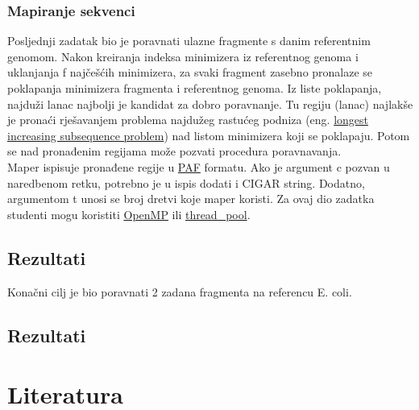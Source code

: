 \documentclass[times, 12pt, utf8]{article}
\begin{document}
        \subsubsection{Mapiranje sekvenci}
        Posljednji zadatak bio je poravnati ulazne fragmente s danim referentnim genomom.
        Nakon kreiranja indeksa minimizera iz referentnog genoma i uklanjanja f najčešćih minimizera, za svaki fragment zasebno pronalaze se poklapanja minimizera fragmenta i referentnog genoma. Iz liste poklapanja, najduži lanac najbolji je kandidat za dobro poravnanje. Tu regiju (lanac) najlakše je pronaći rješavanjem problema najdužeg rastućeg podniza (eng. \href{https://en.wikipedia.org/wiki/Longest_increasing_subsequence}{longest increasing subsequence problem}) nad listom minimizera koji se poklapaju. 
        Potom se nad pronađenim regijama može pozvati procedura poravnavanja. \\
        Maper ispisuje pronađene regije u \href{https://github.com/lh3/miniasm/blob/master/PAF.md}{PAF} formatu. Ako je argument \colorbox{gray!30}{c} pozvan u naredbenom retku, potrebno je u ispis dodati i CIGAR string.
        Dodatno, argumentom \colorbox{gray!30}{t} unosi se broj dretvi koje maper koristi. Za ovaj dio zadatka studenti mogu koristiti \href{https://www.openmp.org/}{OpenMP} ili \href{https://github.com/rvaser/thread_pool}{thread\_pool}.
        
        \subsection{Rezultati}
        Konačni cilj je bio poravnati 2 zadana fragmenta na referencu E. coli.

\subsection{Rezultati}

\section{Literatura}

\end{document}
